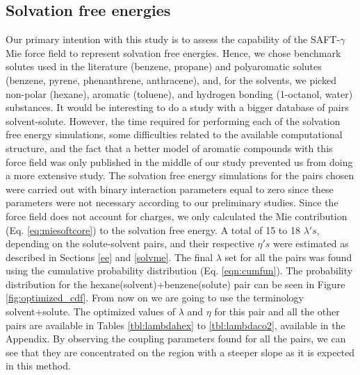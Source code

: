 \documentclass[final,12p,times,twocolumn]{elsarticle}
\begin{document}
	\subsection{Solvation free energies}

	Our primary intention with this study is to assess the capability of the SAFT-$\gamma$ Mie force field to represent solvation free energies. Hence, we chose benchmark solutes used in the literature (benzene, propane) and polyaromatic solutes (benzene, pyrene, phenanthrene, anthracene), and, for the solvents, we picked non-polar (hexane), aromatic (toluene), and hydrogen bonding (1-octanol, water) substances. It would be interesting to do a study with a bigger database of pairs solvent-solute. However, the time required for performing each of the solvation free energy simulations, some difficulties related to the available computational structure, and the fact that a better model of aromatic compounds with this force field was only published in the middle of our study prevented us from doing a more extensive study. The solvation free energy simulations for the pairs chosen were carried out with binary interaction parameters equal to zero since these parameters were not necessary according to our preliminary studies. Since the force field does not account for charges, we only calculated the Mie contribution (Eq. \ref{eq:miesoftcore}) to the solvation free energy. A total of 15 to 18 $\lambda 's$, depending on the solute-solvent pairs, and their respective $\eta 's$ were estimated as described in Sections \ref{ee} and \ref{solvme}. The final $\lambda$ set for all the pairs was found using the cumulative probability distribution (Eq. \eqref{eqn:cumfun}). The probability distribution for the hexane(solvent)+benzene(solute) pair can be seen in Figure \ref{fig:optimized_cdf}. From now on we are going to use the terminology solvent+solute. The optimized values of $\lambda$ and $\eta$ for this pair and all the other pairs are available in Tables \ref{tbl:lambdahex} to \ref{tbl:lambdaco2}, available in the Appendix. By observing the coupling parameters found for all the pairs, we can see that they are concentrated on the region with a steeper slope as it is expected in this method.
	
\end{document}
